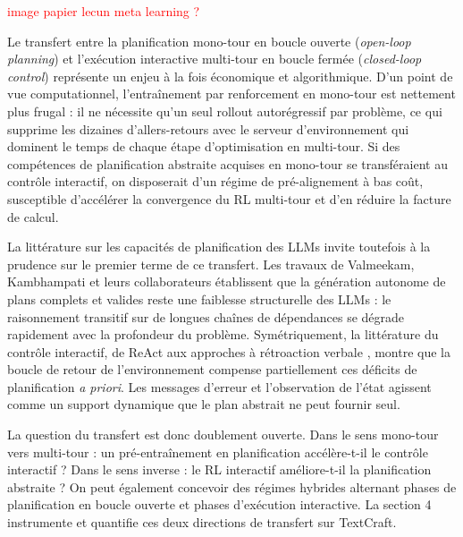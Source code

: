\documentclass[11pt,a4paper]{article}
\begin{document}
\textcolor{red}{image papier lecun meta learning ?}

Le transfert entre la planification mono-tour en boucle ouverte (\emph{open-loop planning}) et l'exécution interactive multi-tour en boucle fermée (\emph{closed-loop control}) représente un enjeu à la fois économique et algorithmique. D'un point de vue computationnel, l'entraînement par renforcement en mono-tour est nettement plus frugal : il ne nécessite qu'un seul rollout autorégressif par problème, ce qui supprime les dizaines d'allers-retours avec le serveur d'environnement qui dominent le temps de chaque étape d'optimisation en multi-tour. Si des compétences de planification abstraite acquises en mono-tour se transféraient au contrôle interactif, on disposerait d'un régime de pré-alignement à bas coût, susceptible d'accélérer la convergence du RL multi-tour et d'en réduire la facture de calcul.

La littérature sur les capacités de planification des LLMs invite toutefois à la prudence sur le premier terme de ce transfert. Les travaux de Valmeekam, Kambhampati et leurs collaborateurs \cite{valmeekam2023planning, kambhampati2024llmmodulo} établissent que la génération autonome de plans complets et valides reste une faiblesse structurelle des LLMs : le raisonnement transitif sur de longues chaînes de dépendances se dégrade rapidement avec la profondeur du problème. Symétriquement, la littérature du contrôle interactif, de ReAct \cite{yao2023react} aux approches à rétroaction verbale \cite{shinn2023reflexion}, montre que la boucle de retour de l'environnement compense partiellement ces déficits de planification \emph{a priori}. Les messages d'erreur et l'observation de l'état agissent comme un support dynamique que le plan abstrait ne peut fournir seul.

La question du transfert est donc doublement ouverte. Dans le sens mono-tour vers multi-tour : un pré-entraînement en planification accélère-t-il le contrôle interactif ? Dans le sens inverse : le RL interactif améliore-t-il la planification abstraite ? On peut également concevoir des régimes hybrides alternant phases de planification en boucle ouverte et phases d'exécution interactive. La section 4 instrumente et quantifie ces deux directions de transfert sur TextCraft.
\end{document}
